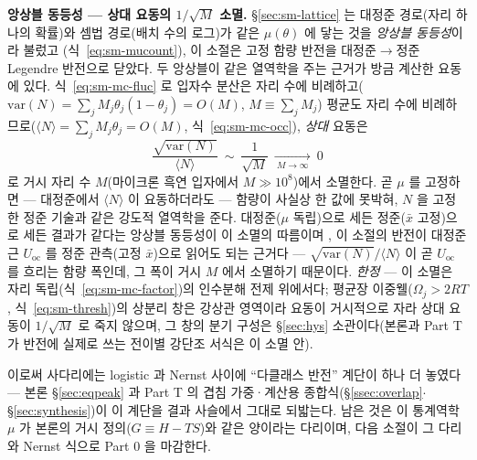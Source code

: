 \begin{bgbox}
\textbf{앙상블 동등성 --- 상대 요동의 $1/\sqrt{M}$ 소멸.} \S\ref{sec:sm-lattice} 는 대정준 경로(자리 하나의
확률)와 셈법 경로(배치 수의 로그)가 같은 $\mu(\theta)$ 에 닿는 것을 \emph{앙상블 동등성}이라 불렀고
(식~\eqref{eq:sm-mucount}), 이 소절은 고정 함량 반전을 대정준$\to$정준 Legendre 반전으로 닫았다. 두 앙상블이
같은 열역학을 주는 근거가 방금 계산한 요동에 있다. 식~\eqref{eq:sm-mc-fluc} 로 입자수 분산은 자리 수에
비례하고($\mathrm{var}(N)=\sum_jM_j\theta_j(1-\theta_j)=O(M)$, $M\equiv\sum_jM_j$) 평균도 자리 수에
비례하므로($\langle N\rangle=\sum_jM_j\theta_j=O(M)$, 식~\eqref{eq:sm-mc-occ}), \emph{상대} 요동은
\[
\frac{\sqrt{\mathrm{var}(N)}}{\langle N\rangle}\ \sim\ \frac{1}{\sqrt{M}}
\ \xrightarrow[\ M\to\infty\ ]{}\ 0
\]
로 거시 자리 수 $M$(마이크론 흑연 입자에서 $M\gg10^{8}$)에서 소멸한다. 곧 $\mu$ 를 고정하면 --- 대정준에서
$\langle N\rangle$ 이 요동하더라도 --- 함량이 사실상 한 값에 못박혀, $N$ 을 고정한 정준 기술과 같은 강도적
열역학을 준다. 대정준($\mu$ 독립)으로 세든 정준($\bar x$ 고정)으로 세든 결과가 같다는 앙상블 동등성이 이
소멸의 따름이며 \cite{hill1960,mcquarrie1976}, 이 소절의 반전이 대정준 근 $U_\mathrm{oc}$ 를 정준 관측(고정
$\bar x$)으로 읽어도 되는 근거다 --- $\sqrt{\mathrm{var}(N)}/\langle N\rangle$ 이 곧 $U_\mathrm{oc}$ 를
흐리는 함량 폭인데, 그 폭이 거시 $M$ 에서 소멸하기 때문이다. \emph{한정} --- 이 소멸은 자리
독립(식~\eqref{eq:sm-mc-factor})의 인수분해 전제 위에서다; 평균장 이중웰($\Omega_j>2RT$,
식~\eqref{eq:sm-thresh})의 상분리 창은 강상관 영역이라 요동이 거시적으로 자라 상대 요동이 $1/\sqrt{M}$ 로 죽지
않으며, 그 창의 분기 구성은 \S\ref{sec:hys} 소관이다(본론과 Part T 가 반전에 실제로 쓰는 전이별 강단조
서식은 이 소멸 안).
\end{bgbox}

이로써 사다리에는 logistic 과 Nernst 사이에 ``다클래스 반전'' 계단이 하나 더 놓였다 --- 본론
\S\ref{sec:eqpeak} 과 Part T 의 겹침 가중·계산용 종합식(\S\ref{ssec:overlap}$\cdot$\S\ref{sec:synthesis})이 이 계단을 결과 사슬에서 그대로 되밟는다. 남은
것은 이 통계역학 $\mu$ 가 본론의 거시 정의($G\equiv H-TS$)와 같은 양이라는 다리이며, 다음 소절이 그 다리와
Nernst 식으로 Part 0 을 마감한다.


